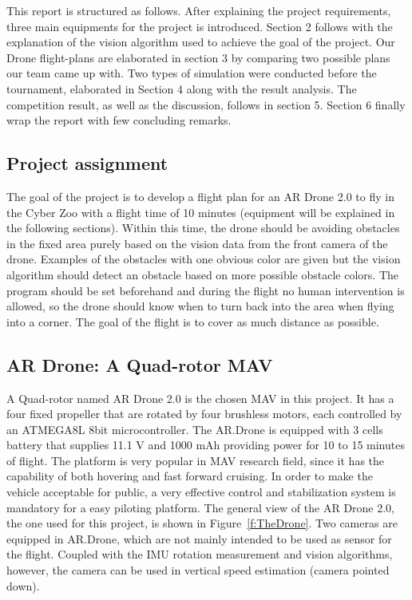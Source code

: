 This report is structured as follows. After explaining the project requirements, three main equipments for the project is introduced. Section 2 follows with the explanation of the vision algorithm used to achieve the goal of the project. Our Drone flight-plans are elaborated in section 3 by comparing two possible plans our team came up with. Two types of simulation were conducted before the tournament, elaborated in Section 4 along with the result analysis. The competition result, as well as the discussion, follows in section 5. Section 6 finally wrap the report with few concluding remarks.

\subsection{Project assignment}
The goal of the project is to develop a flight plan for an AR Drone 2.0 to fly in the Cyber Zoo with a flight time of 10 minutes (equipment will be explained in the following sections). Within this time, the drone should be avoiding obstacles in the fixed area purely based on the vision data from the front camera of the drone. Examples of the obstacles with one obvious color are given but the vision algorithm should detect an obstacle based on more possible obstacle colors. The program should be set beforehand and during the flight no human intervention is allowed, so the drone should know when to turn back into the area when flying into a corner. The goal of the flight is to cover as much distance as possible.

\subsection{AR Drone: A Quad-rotor MAV}
A Quad-rotor named AR Drone 2.0 is the chosen MAV in this project. It has a four fixed propeller that are rotated by four brushless motors, each controlled by an ATMEGA8L 8bit microcontroller. The AR.Drone is equipped with 3 cells battery that supplies 11.1 V and 1000 mAh providing power for 10 to 15 minutes of flight. The platform is very popular in MAV research field\cite{Bristeau:11}\cite{Pestana:13}\cite{Lugo:14}, since it has the capability of both hovering and fast forward cruising. In order to make the vehicle acceptable for public, a very effective control and stabilization system is mandatory for a easy piloting platform. The general view of the AR Drone 2.0, the one used for this project, is shown in Figure~\ref{f:TheDrone}. Two cameras are equipped in AR.Drone, which are not mainly intended to be used as sensor for the flight. Coupled with the IMU rotation measurement and vision algorithms, however, the camera can be used in vertical speed estimation (camera pointed down). \\


